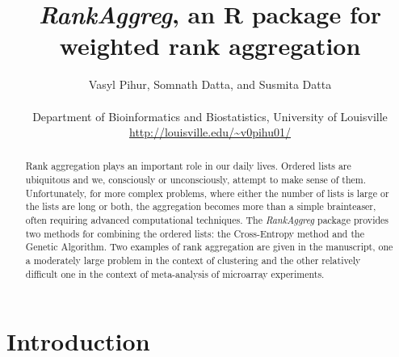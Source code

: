 \documentclass[11pt]{article}
\begin{document}
\author{Vasyl
  Pihur, Somnath Datta, and Susmita Datta \\ \\
Department of Bioinformatics and Biostatistics, University of
Louisville \\
\url{http://louisville.edu/~v0pihu01/} }

\title{\emph{RankAggreg}, an R package for weighted rank 
aggregation}

\maketitle

\tableofcontents
\begin{abstract}
Rank aggregation plays an important role in our daily lives. Ordered lists are ubiquitous
and we, consciously or unconsciously, attempt to make sense of them. Unfortunately, for more
complex problems, where either the number of lists is large or the lists are long or both,
the aggregation becomes more than a simple brainteaser, often requiring advanced
computational techniques. The \emph{RankAggreg} package provides two methods for combining the 
ordered lists: the Cross-Entropy method and the Genetic Algorithm. Two examples of rank aggregation are given in 
the manuscript, one a moderately large problem in the context of clustering and the other relatively difficult one 
in the context of meta-analysis of microarray experiments.

\end{abstract}



\section{Introduction}
\label{sec:intro}
\end{document}
